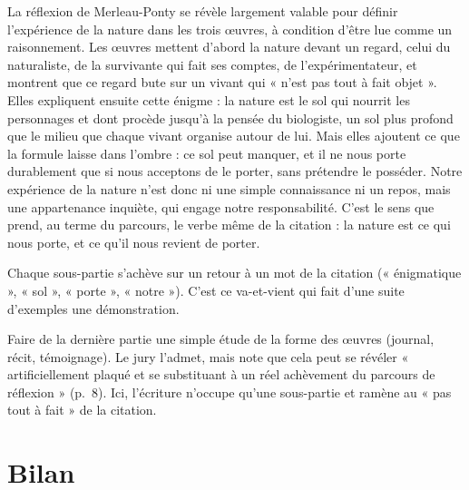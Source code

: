 \documentclass[11pt,a4paper]{article}
\begin{document}
La réflexion de Merleau-Ponty se révèle largement valable pour définir l'expérience de la nature dans les trois œuvres, à condition d'être lue comme un raisonnement. Les œuvres mettent d'abord la nature devant un regard, celui du naturaliste, de la survivante qui fait ses comptes, de l'expérimentateur, et montrent que ce regard bute sur un vivant qui « n'est pas tout à fait objet ». Elles expliquent ensuite cette énigme : la nature est le sol qui nourrit les personnages et dont procède jusqu'à la pensée du biologiste, un sol plus profond que le milieu que chaque vivant organise autour de lui. Mais elles ajoutent ce que la formule laisse dans l'ombre : ce sol peut manquer, et il ne nous porte durablement que si nous acceptons de le porter, sans prétendre le posséder. Notre expérience de la nature n'est donc ni une simple connaissance ni un repos, mais une appartenance inquiète, qui engage notre responsabilité. C'est le sens que prend, au terme du parcours, le verbe même de la citation : la nature est ce qui nous porte, et ce qu'il nous revient de porter.

\begin{methode}

Chaque sous-partie s'achève sur un retour à un mot de la citation (« énigmatique », « sol », « porte », « notre »). C'est ce va-et-vient qui fait d'une suite d'exemples une démonstration.

\end{methode}

\begin{piege}

Faire de la dernière partie une simple étude de la forme des œuvres (journal, récit, témoignage). Le jury l'admet, mais note que cela peut se révéler « artificiellement plaqué et se substituant à un réel achèvement du parcours de réflexion » (p.~8). Ici, l'écriture n'occupe qu'une sous-partie et ramène au « pas tout à fait » de la citation.

\end{piege}

\hypertarget{bilan}{%
\section{Bilan}\label{bilan}}
\end{document}

